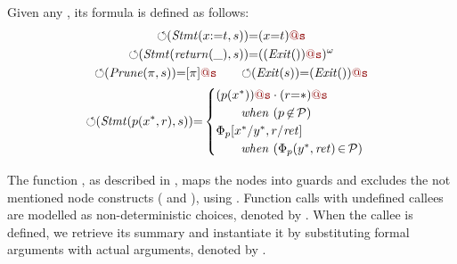 {
\begin{definition}
\label{def:NodeS2Singleton_Events}
{{Given any , its \code{\Phi} formula is defined as follows:}} 
{
\begin{gather*}
\nodeEv{(\m{Stmt}(x{:=}t,s))} {\nodeEvop} (x{=}t)\loc{@s} 
\\  
\nodeEv{(\m{Stmt}(\m{return}(\_),s))}{\nodeEvop} 
((\m{Exit}())\loc{@s})^\omega
\\ 
\nodeEv{(\m{Prune}(\pi,s))}{\nodeEvop} [\pi]\loc{@s} 
\qquad 
\nodeEv{(\m{Exit}(s))}{\nodeEvop} (\m{Exit}())\loc{@s}
\\
\nodeEv{(\m{Stmt}(\nm(x^*,r),s))}{\nodeEvop}
\begin{cases}
(\nm(x^*))\loc{@s} \cdot(r{=}*)\loc{@s} \\
 \qquad \m{when}\    ({\text{{$\nm\,{\not\in}\,\mathcal{P}$}}})
\\
\effect_{\nm}[x^*/y^*, r/\m{ret}]   \\
 \qquad \m{when} \    ({\text{{$\effect_{\nm}(y^*,\m{ret})\,{\in}\,\mathcal{P}$}}})
\end{cases}
\end{gather*}
}
\end{definition}
}



The function \code{\nodeEv}, as described in  , maps the  nodes into guards and excludes the not mentioned node constructs ( and ), using \code{\epsilon}. 
Function calls with undefined callees are modelled as non-deterministic choices, denoted by . When the callee is defined, we retrieve its summary \code{\effect_{\nm}} and instantiate it by substituting formal arguments with actual arguments, denoted by \code{\effect_{\nm}[x^*/y^*, r/\m{ret}]}. %














